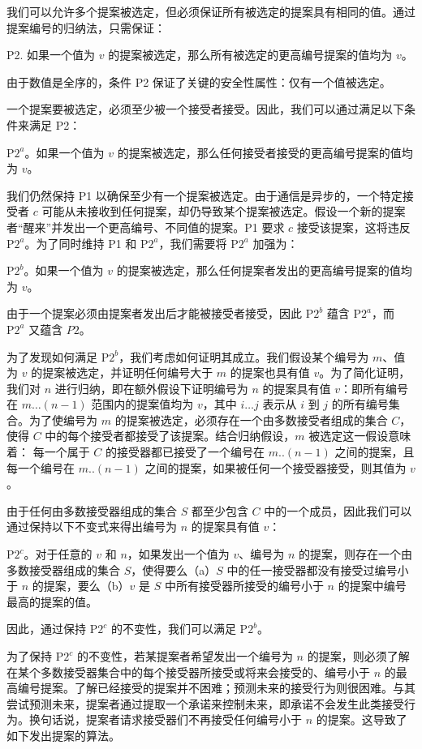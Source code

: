 \documentclass[12pt,a4paper]{report} %
\begin{document}
我们可以允许多个提案被选定，但必须保证所有被选定的提案具有相同的值。通过提案编号的归纳法，只需保证：

P2. 如果一个值为 $v$ 的提案被选定，那么所有被选定的更高编号提案的值均为 $v$。

由于数值是全序的，条件 P2 保证了关键的安全性属性：仅有一个值被选定。

一个提案要被选定，必须至少被一个接受者接受。因此，我们可以通过满足以下条件来满足 P2：

$\mathrm{P} 2^{a}$。如果一个值为 $v$ 的提案被选定，那么任何接受者接受的更高编号提案的值均为 $v$。

我们仍然保持 P1 以确保至少有一个提案被选定。由于通信是异步的，一个特定接受者 $c$ 可能从未接收到任何提案，却仍导致某个提案被选定。假设一个新的提案者“醒来”并发出一个更高编号、不同值的提案。P1 要求 $c$ 接受该提案，这将违反 $\mathrm{P} 2^{a}$。为了同时维持 P1 和 $\mathrm{P} 2^{a}$，我们需要将 $\mathrm{P} 2^{a}$ 加强为：

$\mathrm{P} 2^{b}$。如果一个值为 $v$ 的提案被选定，那么任何提案者发出的更高编号提案的值均为 $v$。

由于一个提案必须由提案者发出后才能被接受者接受，因此 $\mathrm{P} 2^{b}$ 蕴含 $\mathrm{P} 2^{a}$，而 $\mathrm{P} 2^{a}$ 又蕴含 $P 2$。

为了发现如何满足 $\mathrm{P} 2^{b}$，我们考虑如何证明其成立。我们假设某个编号为 $m$、值为 $v$ 的提案被选定，并证明任何编号大于 $m$ 的提案也具有值 $v$。为了简化证明，我们对 $n$ 进行归纳，即在额外假设下证明编号为 $n$ 的提案具有值 $v$：即所有编号在 $m \ldots(n-1)$ 范围内的提案值均为 $v$，其中 $i \ldots j$ 表示从 $i$ 到 $j$ 的所有编号集合。为了使编号为 $m$ 的提案被选定，必须存在一个由多数接受者组成的集合 $C$，使得 $C$ 中的每个接受者都接受了该提案。结合归纳假设，$m$ 被选定这一假设意味着：
每一个属于 $C$ 的接受器都已接受了一个编号在 $m..(n-1)$ 之间的提案，且每一个编号在 $m..(n-1)$ 之间的提案，如果被任何一个接受器接受，则其值为 $v$。

由于任何由多数接受器组成的集合 $S$ 都至少包含 $C$ 中的一个成员，因此我们可以通过保持以下不变式来得出编号为 $n$ 的提案具有值 $v$：

$\mathrm{P} 2^{c}$。对于任意的 $v$ 和 $n$，如果发出一个值为 $v$、编号为 $n$ 的提案，则存在一个由多数接受器组成的集合 $S$，使得要么（a）$S$ 中的任一接受器都没有接受过编号小于 $n$ 的提案，要么（b）$v$ 是 $S$ 中所有接受器所接受的编号小于 $n$ 的提案中编号最高的提案的值。

因此，通过保持 $\mathrm{P} 2^{c}$ 的不变性，我们可以满足 $\mathrm{P} 2^{b}$。

为了保持 $\mathrm{P} 2^{c}$ 的不变性，若某提案者希望发出一个编号为 $n$ 的提案，则必须了解在某个多数接受器集合中的每个接受器所接受或将来会接受的、编号小于 $n$ 的最高编号提案。了解已经接受的提案并不困难；预测未来的接受行为则很困难。与其尝试预测未来，提案者通过提取一个承诺来控制未来，即承诺不会发生此类接受行为。换句话说，提案者请求接受器们不再接受任何编号小于 $n$ 的提案。这导致了如下发出提案的算法。
\end{document}
